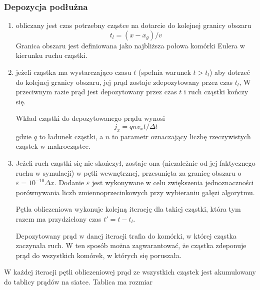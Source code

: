 \subsubsection{Depozycja podłużna} 
\begin{enumerate}
    \item{} obliczany jest czas potrzebny cząstce na dotarcie do kolejnej
    granicy obszaru
    \begin{equation}
        t_l = (x - x_g)/v
    \end{equation}
    Granica obszaru jest definiowana jako najbliższa połowa komórki Eulera w kierunku
    ruchu cząstki.
    \item
    \begin{itemize}
        \itemi{} jeżeli cząstka ma wystarczająco czasu $t$ (spełnia warunek $t > t_l$) aby
        dotrzeć do kolejnej granicy obszaru, jej prąd zostaje zdepozytowany przez czas $t_l$,
        \itemi{} W przeciwnym razie prąd jest depozytowany przez czas $t$ i ruch cząstki kończy się.
    \end{itemize}
    Wkład cząstki do depozytowanego prądu wynosi
    \begin{equation}
        j_x = q n v_x t/\Delta t
    \end{equation}
    gdzie $q$ to ładunek cząstki, a $n$ to parametr  oznaczający liczbę
    rzeczywistych cząstek w makrocząstce.

    \item{} Jeżeli ruch cząstki się nie skończył, zostaje ona (niezależnie od
    jej faktycznego ruchu w symulacji) w pętli wewnętrznej, 
    przesunięta za granicę obszaru o $\varepsilon =
    10^{-10} \Delta x$. Dodanie $\varepsilon$ jest wykonywane w celu zwiększenia
    jednoznaczności porównywania liczb zmiennoprzecinkowych przy wybieraniu
    gałęzi algorytmu.

    Pętla obliczeniowa wykonuje kolejną iterację dla takiej cząstki, która tym razem
    ma przydzielony czas $t' = t - t_l$.

    Depozytowany prąd w danej iteracji trafia do komórki, w której cząstka zaczynała ruch. W ten sposób
    można zagwarantować, że cząstka zdeponuje prąd do wszystkich komórek, w których się poruszała.
\end{enumerate}

W każdej iteracji pętli obliczeniowej prąd ze wszystkich cząstek jest
akumulowany do tablicy prądów na siatce. Tablica ma rozmiar  

